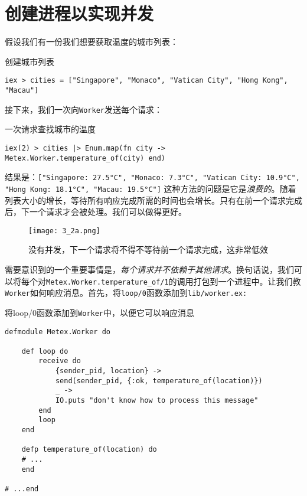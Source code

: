 \section{创建进程以实现并发}

假设我们有一份我们想要获取温度的城市列表：

\begin{code}{创建城市列表}
\begin{verbatim}
iex > cities = ["Singapore", "Monaco", "Vatican City", "Hong Kong", "Macau"]
\end{verbatim}
\label{lst:create_city_list}
\end{code}

接下来，我们一次向\texttt{Worker}发送每个请求：

\begin{code}{一次请求查找城市的温度}
\begin{verbatim}
iex(2) > cities |> Enum.map(fn city -> Metex.Worker.temperature_of(city) end)
\end{verbatim}
\label{lst:request_cities_temperature}
\end{code}

结果是：\texttt{["Singapore: 27.5°C", "Monaco: 7.3°C", "Vatican City: 10.9°C", "Hong Kong: 18.1°C", "Macau: 19.5°C"]}
这种方法的问题是它是\emph{浪费的}。随着列表大小的增长，等待所有响应完成所需的时间也会增长。只有在前一个请求完成后，下一个请求才会被处理。我们可以做得更好。

\begin{figure}[!ht]
    \centering
    \texttt{[image: 3\_2a.png]}
    \caption{没有并发，下一个请求将不得不等待前一个请求完成，这非常低效}
    \label{fig:3_2a}
\end{figure}


需要意识到的一个重要事情是，\emph{每个请求并不依赖于其他请求}。换句话说，我们可以将每个对\texttt{Metex.Worker.temperature\_of/1}的调用打包到一个进程中。让我们教\texttt{Worker}如何响应消息。首先，将\texttt{loop/0}函数添加到\texttt{lib/worker.ex:}

\begin{code}{将loop/0函数添加到\texttt{Worker}中，以便它可以响应消息}
\begin{verbatim}
defmodule Metex.Worker do

    def loop do
        receive do
            {sender_pid, location} ->
            send(sender_pid, {:ok, temperature_of(location)})
            _ ->
            IO.puts "don't know how to process this message"
        end
        loop
    end

    defp temperature_of(location) do
    # ...
    end

# ...end
\end{verbatim}
\label{lst:add_loop_to_worker}
\end{code}

